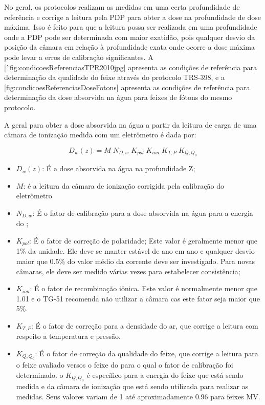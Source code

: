 \documentclass[11pt,a4paper]{article}
\newcounter{exemplo}
\begin{document}
    No geral, os protocolos realizam as medidas em uma certa profundidade de referência e corrige a leitura pela PDP para obter a dose na profundidade de dose máxima. Isso é feito para que a leitura possa ser realizada em uma profundidade onde a PDP pode ser determinada com maior exatidão, pois qualquer desvio da posição da câmara em relação à profundidade exata onde ocorre a dose máxima pode levar a erros de calibração significantes. A \ref{`fig:condicoesReferenciasTPR2010jpg} apresenta as condições de referência para determinação da qualidade do feixe através do protocolo TRS-398, e a \ref{fig:condicoesReferenciasDoseFotons} apresenta as condições de referência para determinação da dose absorvida na água para feixes de fótons do mesmo protocolo.

    A  geral para obter a dose absorvida na água a partir da leitura de carga de uma câmara de ionização medida com um eletrômetro é dada por:

  		$$D_{w}(z) = M \; N_{D,w} \; K_{pol} \; K_{ion} \; K_{T,P} \; K_{Q,Q_0}$$

	\begin{exemplo}[onde:]
		\begin{itemize}[label=\textcolor{CarnationPink}{$\star$}]
			\item \textbf{\textcolor{CarnationPink}{$D_{w}(z)$}}: É a dose absorvida na água na profundidade Z;
			\item \textbf{\textcolor{CarnationPink}{$M$}}: é a leitura da câmara de ionização corrigida pela calibração do eletrômetro
			\item \textbf{\textcolor{CarnationPink}{$N_{D,w}$}}: É o fator de calibração para a dose absorvida na água para a energia do ;
			\item \textbf{\textcolor{CarnationPink}{$K_{pol}$}}: É o fator de correção de polaridade; Este valor é geralmente menor que 1\% da unidade. Ele deve se manter estável de ano em ano e qualquer desvio maior que 0.5\% do valor médio da corrente deve ser investigado. Para novas câmaras, ele deve ser medido várias vezes para estabelecer consistência; 
			\item \textbf{\textcolor{CarnationPink}{$K_{ion}$}}: É o fator de recombinação iônica. Este valor é normalmente menor que 1.01 e o TG-51 recomenda não utilizar a câmara cas este fator seja maior que 5\%. 
			\item \textbf{\textcolor{CarnationPink}{$K_{T,P}$}}: É o fator de correção para a densidade do ar, que corrige a leitura com respeito a temperatura e pressão. 
			\item \textbf{\textcolor{CarnationPink}{$K_{Q,Q_0}$}}: É o fator de correção da qualidade do feixe, que corrige a leitura para o feixe avaliado versos o feixe do  para o qual o fator de calibração foi determinado. o $K_{Q,Q_0}$ é específico para a energia do feixe que está sendo medida e da câmara de ionização que está sendo utilizada para realizar as medidas. Seus valores variam de 1 até aproximadamente 0.96 para feixes MV.
		\end{itemize}
	\end{exemplo}
\end{document}
